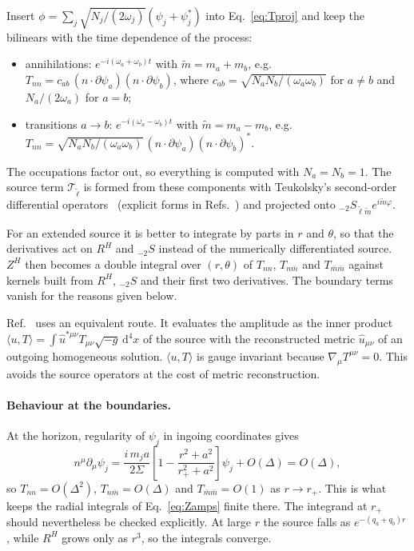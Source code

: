 \documentclass[11pt]{article}
\newcommand{\dd}{\mathrm{d}}
\begin{document}
Insert $\phi=\sum_j\sqrt{N_j/(2\omega_j)}(\psi_j+\psi_j^*)$ into Eq.~\eqref{eq:Tproj} and keep the bilinears with the time dependence of the process:
\begin{itemize}
\item annihilations: $e^{-i(\omega_a+\omega_b)t}$ with $\tilde m=m_a+m_b$, e.g.\ $T_{nn}=c_{ab}\,(n\cdot\partial\psi_a)(n\cdot\partial\psi_b)$, where $c_{ab}=\sqrt{N_aN_b/(\omega_a\omega_b)}$ for $a\neq b$ and $N_a/(2\omega_a)$ for $a=b$;
\item transitions $a\to b$: $e^{-i(\omega_a-\omega_b)t}$ with $\tilde m=m_a-m_b$, e.g.\ $T_{nn}=\sqrt{N_aN_b/(\omega_a\omega_b)}\,(n\cdot\partial\psi_a)(n\cdot\partial\psi_b)^*$.
\end{itemize}
The occupations factor out, so everything is computed with $N_a=N_b=1$. The source term $\mathcal T_{\tilde\ell}$ is formed from these components with Teukolsky's second-order differential operators~\cite{Teukolsky73} (explicit forms in Refs.~\cite{ST03,Hughes00}) and projected onto ${}_{-2}S_{\tilde\ell\tilde m}e^{i\tilde m\varphi}$.

For an extended source it is better to integrate by parts in $r$ and $\theta$, so that the derivatives act on $R^H$ and ${}_{-2}S$ instead of the numerically differentiated source. $Z^H$ then becomes a double integral over $(r,\theta)$ of $T_{nn}$, $T_{n\bar m}$ and $T_{\bar m\bar m}$ against kernels built from $R^H$, ${}_{-2}S$ and their first two derivatives. The boundary terms vanish for the reasons given below.

Ref.~\cite{YK14} uses an equivalent route. It evaluates the amplitude as the inner product $\langle u,T\rangle=\int\hat u^{*\mu\nu}T_{\mu\nu}\sqrt{-g}\,\dd^4x$ of the source with the reconstructed metric $\hat u_{\mu\nu}$ of an outgoing homogeneous solution. $\langle u,T\rangle$ is gauge invariant because $\nabla_\mu T^{\mu\nu}=0$. This avoids the source operators at the cost of metric reconstruction.

\paragraph{Behaviour at the boundaries.} At the horizon, regularity of $\psi_j$ in ingoing coordinates gives
\begin{equation}
n^\mu\partial_\mu\psi_j=\frac{i\,m_ja}{2\Sigma}\left[1-\frac{r^2+a^2}{r_+^2+a^2}\right]\psi_j+O(\Delta)=O(\Delta),
\end{equation}
so $T_{nn}=O(\Delta^2)$, $T_{n\bar m}=O(\Delta)$ and $T_{\bar m\bar m}=O(1)$ as $r\to r_+$. This is what keeps the radial integrals of Eq.~\eqref{eq:Zamps} finite there. The integrand at $r_+$ should nevertheless be checked explicitly. At large $r$ the source falls as $e^{-(q_a+q_b)r}$, while $R^H$ grows only as $r^3$, so the integrals converge.
\end{document}
